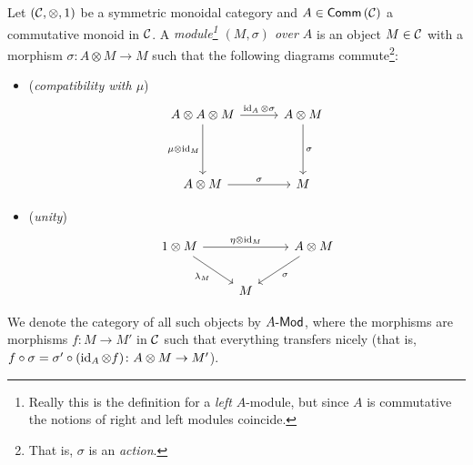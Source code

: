         \begin{definition}\label{df:module-over-monoid}
            Let $(\mathcal{C},\otimes,1)$ be a symmetric monoidal category and $A\in\mathsf{Comm}\left({\mathcal{C}}\right)$ a commutative monoid in $\mathcal{C}$.
            A \emph{module\footnote{
                Really this is the definition for a \emph{left} $A$-module, but since $A$ is commutative the notions of right and left modules coincide.
            } $(M,\sigma)$ over $A$} is an object $M\in\mathcal{C}$ with a morphism $\sigma\colon A\otimes M\to M$ such that the following diagrams commute\footnote{
                That is, $\sigma$ is an \emph{action}.
            }:
            \begin{itemize}
                \item (\emph{compatibility with $\mu$})
                    \begin{equation*}
                        \begin{tikzcd}[row sep=4em, column sep=3em]
                            A\otimes A\otimes M \arrow[r, "\id_A\otimes\sigma"] \arrow[d, swap, "\mu\otimes\id_M"] & A\otimes M \arrow[d, "\sigma"]\\
                            A\otimes M \arrow[r, "\sigma"] & M
                        \end{tikzcd}
                    \end{equation*}
                \item (\emph{unity})
                    \begin{equation*}
                        \begin{tikzcd}[row sep=2em]
                            1\otimes M \arrow[rr, "\eta\otimes\id_M"] \arrow[dr, swap, "\lambda_M"] & & A\otimes M \arrow[dl, "\sigma"]\\
                             & M &
                        \end{tikzcd}
                    \end{equation*}
            \end{itemize}

            We denote the category of all such objects by ${{A}\hbox{-}\mathsf{Mod}}$, where the morphisms are morphisms $f\colon M\to M'$ in $\mathcal{C}$ such that everything transfers nicely (that is, $f\circ\sigma=\sigma'\circ(\operatorname{id}_A\otimes f)\colon A\otimes M\to M'$).
        \end{definition}





